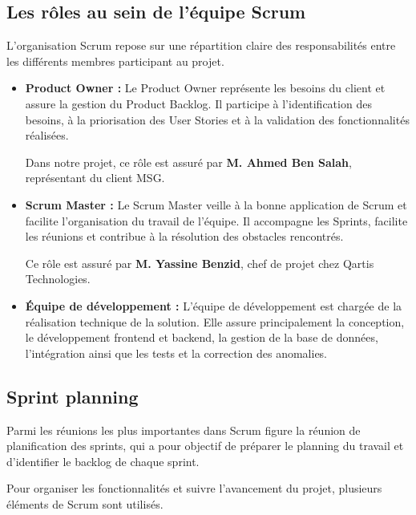
\subsection{Les rôles au sein de l'équipe Scrum}

L'organisation Scrum repose sur une répartition claire des responsabilités entre les différents membres participant au projet.

\begin{itemize}

\item \textbf{Product Owner :}
Le Product Owner représente les besoins du client et assure la gestion du Product Backlog. Il participe à l'identification des besoins, à la priorisation des User Stories et à la validation des fonctionnalités réalisées.

Dans notre projet, ce rôle est assuré par \textbf{M. Ahmed Ben Salah}, représentant du client MSG.

\item \textbf{Scrum Master :}
Le Scrum Master veille à la bonne application de Scrum et facilite l'organisation du travail de l'équipe. Il accompagne les Sprints, facilite les réunions et contribue à la résolution des obstacles rencontrés.

Ce rôle est assuré par \textbf{M. Yassine Benzid}, chef de projet chez Qartis Technologies.

\item \textbf{Équipe de développement :}
L'équipe de développement est chargée de la réalisation technique de la solution. Elle assure principalement la conception, le développement frontend et backend, la gestion de la base de données, l'intégration ainsi que les tests et la correction des anomalies.

\end{itemize}


\subsection{Sprint planning}

Parmi les réunions les plus importantes dans Scrum figure la réunion de planification des sprints, qui a pour objectif de préparer le planning du travail et d'identifier le backlog de chaque sprint.

Pour organiser les fonctionnalités et suivre l'avancement du projet, plusieurs éléments de Scrum sont utilisés.

